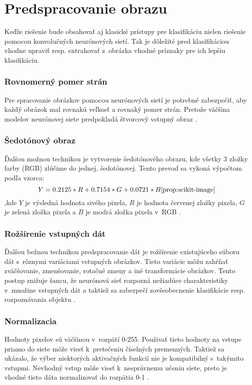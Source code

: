 
\section{Predspracovanie obrazu}
\label{sec:preprocessing}
Keďže riešenie bude obsahovať aj klasické prístupy pre klasifikáciu nielen riešenie pomocou konvolučných neurónových sietí.
Tak je dôležité pred klasifikáciou vhodne upraviť resp. extrahovať z~obrázka vhodné príznaky pre ich lepšiu klasifikáciu.

\subsubsection{Rovnomerný pomer strán}
Pre spracovanie obrázkov pomocou neurónových sietí je potrebné zabezpečiť, aby každý obrázok mal rovnakú veľkosť a rovnaký pomer strán.
Pretože väčšina modelov neurónovej siete predpokladá štvorcový vstupný obraz \cite{odkaz:NNPreprocessing}.

\subsubsection{Šedotónový obraz}
Ďalšou možnou technikou je vytvorenie šedotónového obrazu, kde všetky 3 zložky farby (RGB) zlúčime do jednej, šedotónovej.
Tento prevod sa vykoná výpočtom podľa vzorca:
\begin{equation}
    \label{eq:rgbtogray}
    Y = 0.2125*R + 0.7154*G + 0.0721*B \cite{prop:scikit-image}
\end{equation}
,kde $Y$ je výsledná hodnota sivého pixela, $R$ je hodnota červenej zložky pixela,
$G$ je zelená zložka pixela a $B$ je modrá zložka pixela v~RGB \cite{odkaz:NNPreprocessing}.

\subsubsection{Rožšírenie vstupných dát}
Ďalšou bežnou technikou predspracovanie dát je rožšírenie existujúceho súboru dát s~rôznymi variáciami vstupných obrázkov.
Tieto variácie môžu zahŕňať zväčšovanie, zmenšovanie, rotačné zmeny a iné transformácie obrázkov.
Tento postup znižuje šancu, že neurónová sieť rozpozná nežiadúce charakteristiky v~množine vstupných dát
	a taktiež sa zabezpečí zovšeobecnenie klasifikácie resp. rozpoznávania objektu \cite{odkaz:NNPreprocessing}.

\subsubsection{Normalizacia}
Hodnoty pixelov sú väčšinou v~rozpätí 0-255. Použivať tieto hodnoty na vstupe priamo do siete môže viesť k~pretečeniu číselných premenných.
Taktiež sa ukázalo, že výber niektorých aktivačných funkcií nie je kompatibilný s~takýmito vstupmi.
Nevhodný vstup môže viesť k~nesprávnemu učeniu siete, preto je vhodné tieto dáta normalizovať do rozpätia 0-1 \cite{odkaz:PreprocessingNormalization}.

